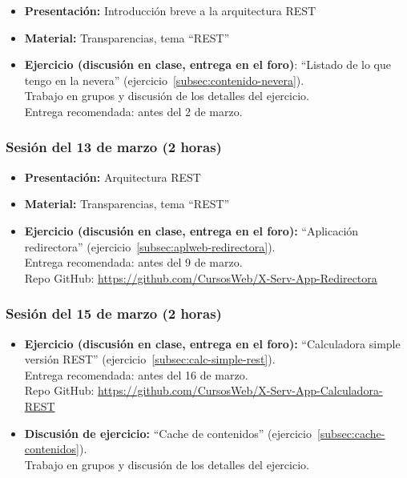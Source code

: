 \documentclass[a4paper,12pt]{article}
\begin{document}
\begin{itemize}
\item \textbf{Presentación:} Introducción breve a la arquitectura REST
\item \textbf{Material:} Transparencias, tema ``REST''
\item \textbf{Ejercicio (discusión en clase, entrega en el foro)}: ``Listado de lo que tengo en la nevera'' (ejercicio~\ref{subsec:contenido-nevera}). \\
  Trabajo en grupos y discusión de los detalles del ejercicio. \\
  Entrega recomendada: antes del 2 de marzo.
\end{itemize}

\subsubsection{Sesión del 13 de marzo (2 horas)}

\begin{itemize}
\item \textbf{Presentación:} Arquitectura REST
\item \textbf{Material:} Transparencias, tema ``REST''
\item \textbf{Ejercicio (discusión en clase, entrega en el foro):} ``Aplicación redirectora'' (ejercicio~\ref{subsec:aplweb-redirectora}). \\
  Entrega recomendada: antes del 9 de marzo. \\
  Repo GitHub: \url{https://github.com/CursosWeb/X-Serv-App-Redirectora}
\end{itemize}


\subsubsection{Sesión del 15 de marzo (2 horas)}

\begin{itemize}
\item \textbf{Ejercicio (discusión en clase, entrega en el foro):} ``Calculadora simple versión REST'' (ejercicio~\ref{subsec:calc-simple-rest}). \\
  Entrega recomendada: antes del 16 de marzo. \\
  Repo GitHub: \url{https://github.com/CursosWeb/X-Serv-App-Calculadora-REST}
\item \textbf{Discusión de ejercicio:} ``Cache de contenidos'' (ejercicio~\ref{subsec:cache-contenidos}). \\
  Trabajo en grupos y discusión de los detalles del ejercicio.
\end{itemize}
\end{document}
